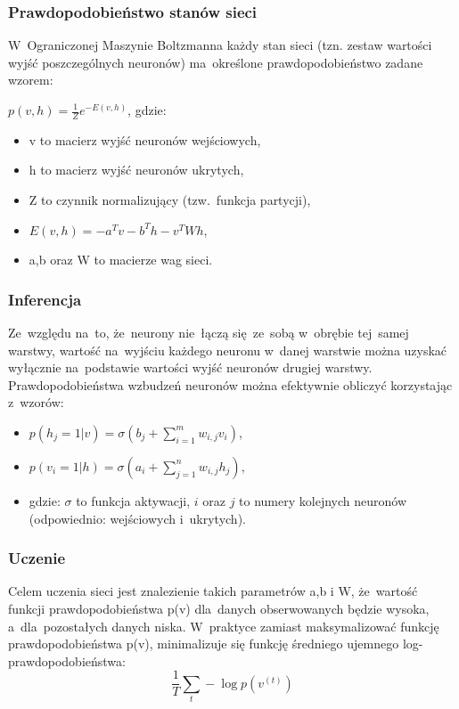\subsubsection{Prawdopodobieństwo stanów sieci}
W~Ograniczonej Maszynie Boltzmanna każdy stan sieci (tzn. zestaw wartości wyjść poszczególnych neuronów)
ma~określone prawdopodobieństwo zadane wzorem:

$p(v,h)=\frac{1}{Z}e^{-E(v,h)}$, gdzie:
\begin{itemize}
  \item v to macierz wyjść neuronów wejściowych,
  \item h to macierz wyjść neuronów ukrytych,
  \item Z to czynnik normalizujący (tzw.~funkcja partycji),
  \item $E(v,h)=-a^{T}v-b^{T}h-v^{T}Wh$,
  \item a,b oraz W to macierze wag sieci.
\end{itemize}

\subsubsection{Inferencja}
Ze~względu na~to, że~neurony nie~łączą się~ze~sobą w~obrębie tej~samej warstwy, wartość na~wyjściu każdego
neuronu w~danej warstwie można uzyskać wyłącznie na~podstawie wartości wyjść neuronów drugiej warstwy.
Prawdopodobieństwa wzbudzeń neuronów można efektywnie obliczyć korzystając z~wzorów:
\begin{itemize}
	\item $p(h_{j}=1|v)=\sigma(b_{j}+\sum\limits_{i=1}^{m}w_{i,j}v_{i})$,
	\item $p(v_{i}=1|h)=\sigma(a_{i}+\sum\limits_{j=1}^{n}w_{i,j}h_{j})$,
	\item gdzie: $\sigma$ to funkcja aktywacji, $i$ oraz $j$ to numery kolejnych neuronów (odpowiednio:
	wejściowych i~ukrytych).
\end{itemize}

\subsubsection{Uczenie}
Celem uczenia sieci jest znalezienie takich parametrów a,b i W, że~wartość funkcji prawdopodobieństwa p(v)
dla~danych obserwowanych będzie wysoka, a~dla~pozostałych danych niska. W~praktyce zamiast maksymalizować
funkcję prawdopodobieństwa p(v), minimalizuje się funkcję średniego ujemnego log-prawdopodobieństwa:
$$\frac{1}{T}\sum\limits_{t}-\log{p(v^{(t)})}$$

